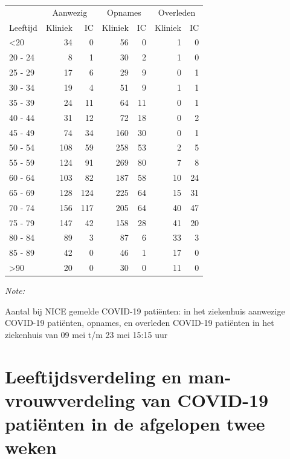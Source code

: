 \documentclass[
  english,
  man,floatsintext]{apa6}
\begin{document}
\begin{table}
\centering\begingroup\fontsize{10}{12}\selectfont

\begin{threeparttable}
\begin{tabular}{lrrrrrr}
\toprule
\multicolumn{1}{c}{ } & \multicolumn{2}{c}{Aanwezig} & \multicolumn{2}{c}{Opnames} & \multicolumn{2}{c}{Overleden} \\
\cmidrule(l{3pt}r{3pt}){2-3} \cmidrule(l{3pt}r{3pt}){4-5} \cmidrule(l{3pt}r{3pt}){6-7}
Leeftijd & Kliniek & IC & Kliniek & IC & Kliniek & IC\\
\midrule
<20 & 34 & 0 & 56 & 0 & 1 & 0\\
20 - 24 & 8 & 1 & 30 & 2 & 1 & 0\\
25 - 29 & 17 & 6 & 29 & 9 & 0 & 1\\
30 - 34 & 19 & 4 & 51 & 9 & 1 & 1\\
35 - 39 & 24 & 11 & 64 & 11 & 0 & 1\\
40 - 44 & 31 & 12 & 72 & 18 & 0 & 2\\
45 - 49 & 74 & 34 & 160 & 30 & 0 & 1\\
50 - 54 & 108 & 59 & 258 & 53 & 2 & 5\\
55 - 59 & 124 & 91 & 269 & 80 & 7 & 8\\
60 - 64 & 103 & 82 & 187 & 58 & 10 & 24\\
65 - 69 & 128 & 124 & 225 & 64 & 15 & 31\\
70 - 74 & 156 & 117 & 205 & 64 & 40 & 47\\
75 - 79 & 147 & 42 & 158 & 28 & 41 & 20\\
80 - 84 & 89 & 3 & 87 & 6 & 33 & 3\\
85 - 89 & 42 & 0 & 46 & 1 & 17 & 0\\
>90 & 20 & 0 & 30 & 0 & 11 & 0\\
\bottomrule
\end{tabular}
\begin{tablenotes}
\item \textit{Note: } 
\item Aantal bij NICE gemelde COVID-19 patiënten: in het ziekenhuis aanwezige COVID-19 patiënten, opnames, en overleden COVID-19 patiënten in het ziekenhuis van 09 mei t/m 23 mei 15:15 uur
\end{tablenotes}
\end{threeparttable}
\endgroup{}
\end{table}

\newpage

\hypertarget{leeftijdsverdeling-en-man-vrouwverdeling-van-covid-19-patiuxebnten-in-de-afgelopen-twee-weken}{%
\section{Leeftijdsverdeling en man-vrouwverdeling van COVID-19 patiënten in de afgelopen twee weken}\label{leeftijdsverdeling-en-man-vrouwverdeling-van-covid-19-patiuxebnten-in-de-afgelopen-twee-weken}}
\end{document}
